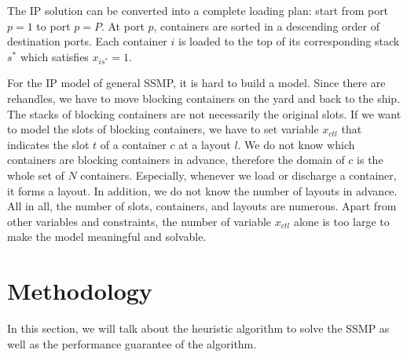 \documentclass[review,3p,times,authoryear,12pt]{elsarticle}
\begin{document}
The IP solution can be converted into a complete loading plan: start from port $p=1$ to port $p=P$. At port $p$, containers are sorted in a descending order of destination ports. Each container $i$ is loaded to the top of its corresponding stack $s^*$ which satisfies $x_{is^*}=1$.

For the IP model of general SSMP, it is hard to build a model.
Since there are rehandles, we have to move blocking containers on the yard and back to the ship.
The stacks of blocking containers are not necessarily the original slots.
If we want to model the slots of blocking containers, we have to set variable $x_{ctl}$ that indicates the slot $t$ of a container $c$ at a layout $l$.
We do not know which containers are blocking containers in advance, therefore the domain of $c$ is the whole set of $N$ containers.
Especially, whenever we load or discharge a container, it forms a layout.
In addition, we do not know the number of layouts in advance.
All in all, the number of slots, containers, and layouts are numerous. Apart from other variables and constraints, the number of variable $x_{ctl}$ alone is too large to make the model meaningful and solvable.

\section{Methodology}
\label{sec:algo}
In this section, we will talk about the heuristic algorithm to solve the SSMP as well as the performance guarantee of the algorithm.

\end{document}
